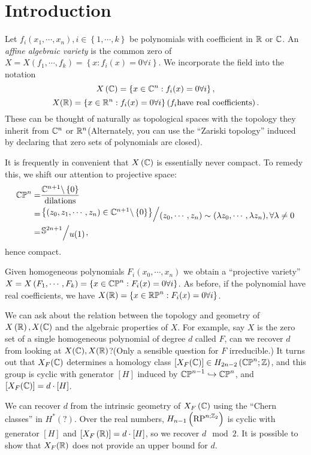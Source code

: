 \section{Introduction}
Let $f_i(x_1,\cdots ,x_n),i\in \left\{1,\cdots ,k\right\} $ be polynomials with coefficient in $\mathbb{R}$ or $\mathbb{C}$. An \textit{affine algebraic variety} is the common zero of $X=X(f_1,\cdots ,f_k)=\left\{x:f_i(x)=0\forall i\right\} $. We incorporate the field into the notation 
\[
  X\left( \mathbb{C} \right) =\left\{x\in \mathbb{C}^{n}:f_i(x)=0\forall i\right\} ,
\] 
\[
  X(\mathbb{R})=\left\{x\in \mathbb{R}^{n}:f_i(x)=0 \forall i\right\} \left( f_i\text{have real coefficients} \right). 
\] 
These can be thought of naturally as topological spaces with the topology they inherit from $\mathbb{C}^{n}$ or $\mathbb{R}^{n}$(Alternately, you can use the ``Zariski topology'' induced by declaring that zero sets of polynomials are closed). 

It is frequently in convenient that $X\left( \mathbb{C} \right) $ is essentially never compact. To remedy this, we shift our attention to projective space:
\begin{align*}
  \CP^{n}= &\frac{\C^{n+1}\backslash \left\{0\right\} }{\text{dilations}}\\
  =&\sfrac{\left\{\left( z_0,z_1,\cdots ,z_{n} \right) \in \C^{n+1}\backslash \left\{0\right\} \right\} }{(z_0,\cdots ,z_n)\sim (\lambda z_0,\cdots ,\lambda z_n), \forall \lambda \neq 0}\\
  = & \sfrac{\Sph^{2n+1}}{u(1)},  
\end{align*}
hence compact.

Given homogeneous polynomials $F_i(x_0,\cdots ,x_n)$ we obtain a ``projective variety'' $X=X\left( F_1,\cdots ,F_k \right) =\left\{x\in \mathbb{CP}^{n}:F_i(x)=0\forall i\right\} $. As before, if the polynomial have real coefficients, we have $X(\mathbb{R})=\left\{x\in \mathbb{RP}^{n}:F_i(x)=0\forall i\right\} $. 

We can ask about the relation between the topology and geometry of $X\left( \mathbb{R} \right) ,X(\mathbb{C})$ and the algebraic properties of $X$. For example, say $X$ is the zero set of a single homogeneous polynomial of degree $d$ called $F$, can we recover $d$ from looking at $X(\mathbb{C}),X(\mathbb{R})$?(Only a sensible question for $F$ irreducible.) It turns out that $X_F(\mathbb{C})$ determines a homology class $\left[ X_F(\mathbb{C}) \right] \in H_{2n-2}\left( \mathbb{CP}^{n};\mathbb{Z} \right) $, and this group is cyclic with generator $\left[ H \right] $ induced by $\mathbb{CP}^{n-1}\hookrightarrow \mathbb{CP}^{n}$, and $\left[ X_F(\mathbb{C}) \right] =d\cdot \left[ H \right] $.

We can recover $d$ from the intrinsic geometry of $X_F\left( \mathbb{C} \right) $ using the ``Chern classes'' in $H^{*}\left( ? \right) $. Over the real numbers, $H_{n-1}\left( \mathrm{RP}^{n;\mathbb{Z}_2} \right) $ is cyclic with generator $\left[ H \right] $ and $\left[ X_F\left( \mathbb{R} \right)  \right] =d\cdot \left[ H \right] $, so we recover $d \mod 2$. 
It is possible to show that $X_F(\mathbb{R})$ does not provide an upper bound for $d$.

